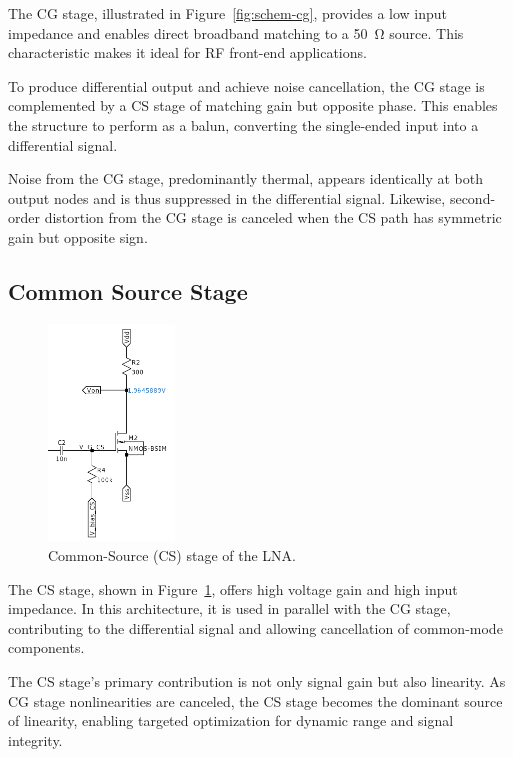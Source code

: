 The CG stage, illustrated in Figure~\ref{fig:schem-cg}, provides a low input impedance and enables direct broadband matching to a 50~\si{\ohm} source. This characteristic makes it ideal for RF front-end applications.

To produce differential output and achieve noise cancellation, the CG stage is complemented by a CS stage of matching gain but opposite phase. This enables the structure to perform as a balun, converting the single-ended input into a differential signal.

Noise from the CG stage, predominantly thermal, appears identically at both output nodes and is thus suppressed in the differential signal. Likewise, second-order distortion from the CG stage is canceled when the CS path has symmetric gain but opposite sign.

\subsection{Common Source Stage}

\begin{figure}[H]
    \centering
    \includegraphics[width=0.3\textwidth]{Images/schem-CS.png}
    \caption{Common-Source (CS) stage of the LNA.}
    \label{fig:schem-cs}
\end{figure}

The CS stage, shown in Figure~\ref{fig:schem-cs}, offers high voltage gain and high input impedance. In this architecture, it is used in parallel with the CG stage, contributing to the differential signal and allowing cancellation of common-mode components.

The CS stage's primary contribution is not only signal gain but also linearity. As CG stage nonlinearities are canceled, the CS stage becomes the dominant source of linearity, enabling targeted optimization for dynamic range and signal integrity.

